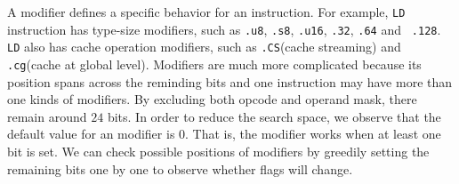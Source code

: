 A modifier defines a specific behavior for an instruction. For example,
{\tt LD} instruction has type-size modifiers, such as {\tt .u8}, {\tt .s8}, {\tt .u16}, {\tt .32}, {\tt .64} and {\tt 
.128}. {\tt LD} also has cache operation modifiers, such as {\tt .CS}(cache streaming) and {\tt .cg}(cache at global 
level). Modifiers are much more complicated because its position spans across the reminding bits and one instruction 
may have more than one kinds of modifiers. By excluding both opcode and operand mask, there remain around $24$ bits. In 
order to reduce the search space, we observe that the default value for an modifier is $0$. That is, the modifier works when at 
least one bit is set. We can check possible positions of modifiers by greedily setting the remaining bits one by one to 
observe whether flags will change.


